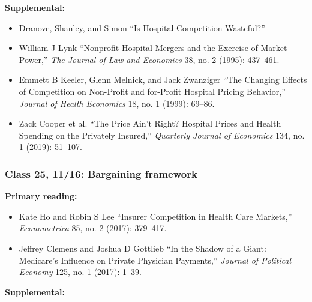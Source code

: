 \documentclass[11pt,]{article}
\providecommand{\tightlist}{%
  \setlength{\itemsep}{0pt}\setlength{\parskip}{0pt}}
\begin{document}
\textbf{Supplemental:}

\begin{itemize}
\tightlist
\item
  Dranove, Shanley, and Simon {``Is Hospital Competition Wasteful?''}
\item
  William J Lynk {``Nonprofit Hospital Mergers and the Exercise of
  Market Power,''} \emph{The Journal of Law and Economics} 38, no. 2
  (1995): 437--461.
\item
  Emmett B Keeler, Glenn Melnick, and Jack Zwanziger {``The Changing
  Effects of Competition on Non-Profit and for-Profit Hospital Pricing
  Behavior,''} \emph{Journal of Health Economics} 18, no. 1 (1999):
  69--86.
\item
  Zack Cooper et al. {``The Price Ain't Right? {Hospital} Prices and
  Health Spending on the Privately Insured,''} \emph{Quarterly Journal
  of Economics} 134, no. 1 (2019): 51--107.
\end{itemize}

\hypertarget{class-25-1116-bargaining-framework}{%
\subsubsection{Class 25, 11/16: Bargaining
framework}\label{class-25-1116-bargaining-framework}}

\textbf{Primary reading:}

\begin{itemize}
\tightlist
\item
  Kate Ho and Robin S Lee {``Insurer Competition in Health Care
  Markets,''} \emph{Econometrica} 85, no. 2 (2017): 379--417.
\item
  Jeffrey Clemens and Joshua D Gottlieb {``In the Shadow of a Giant:
  {Medicare}'s Influence on Private Physician Payments,''} \emph{Journal
  of Political Economy} 125, no. 1 (2017): 1--39.
\end{itemize}

\textbf{Supplemental:}
\end{document}
